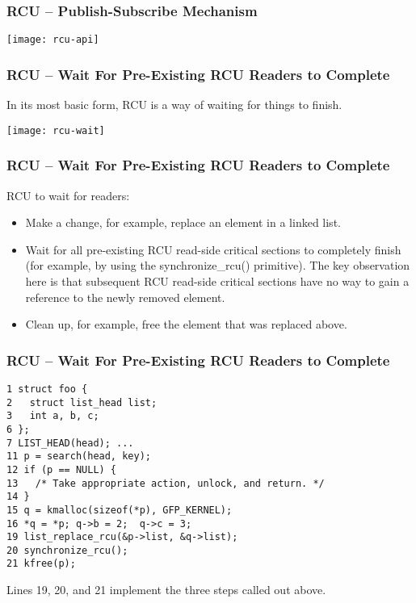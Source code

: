 \begin{frame}[fragile]
    \frametitle{RCU -- Publish-Subscribe Mechanism}
    \centering
    \texttt{[image: rcu-api]}
\end{frame}


\begin{frame}[fragile]
    \frametitle{RCU -- Wait For Pre-Existing RCU Readers to Complete}
    \Large
    In its most basic form, RCU is a way of waiting for things to finish. 
    
    \centering
\texttt{[image: rcu-wait]}
\end{frame}



\begin{frame}[fragile]
    \frametitle{RCU -- Wait For Pre-Existing RCU Readers to Complete}
    \Large
RCU to wait for readers: 
\begin{itemize}
    \item  Make a change, for example, replace an element in a linked list. 
    \item  Wait for all pre-existing RCU read-side critical sections to completely finish (for example, by using the synchronize\_rcu() primitive). The key observation here is that subsequent RCU read-side critical sections have no way to gain a reference to the newly removed element. 
    \item Clean up, for example, free the element that was replaced above.  
\end{itemize}
\end{frame}


\begin{frame}[fragile]
    \frametitle{RCU -- Wait For Pre-Existing RCU Readers to Complete}
    
    \small
    \begin{block}{}
        \begin{verbatim}
1 struct foo {
2   struct list_head list;
3   int a, b, c;
6 };
7 LIST_HEAD(head); ...
11 p = search(head, key);
12 if (p == NULL) {
13   /* Take appropriate action, unlock, and return. */
14 }
15 q = kmalloc(sizeof(*p), GFP_KERNEL);
16 *q = *p; q->b = 2;  q->c = 3;
19 list_replace_rcu(&p->list, &q->list);
20 synchronize_rcu();
21 kfree(p);
\end{verbatim}
\end{block}  
\large
Lines 19, 20, and 21 implement the three steps called out above.
\end{frame}

